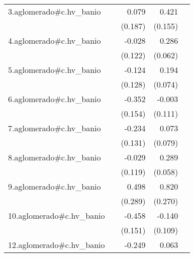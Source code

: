 {\begin{longtable}{l*{4}{D{.}{.}{-1}}}
\addlinespace
3.aglomerado#c.hv\_banio&                     &       0.079         &       0.421\sym{**} &                     \\
            &                     &     (0.187)         &     (0.155)         &                     \\
\addlinespace
4.aglomerado#c.hv\_banio&                     &      -0.028         &       0.286\sym{***}&                     \\
            &                     &     (0.122)         &     (0.062)         &                     \\
\addlinespace
5.aglomerado#c.hv\_banio&                     &      -0.124         &       0.194\sym{**} &                     \\
            &                     &     (0.128)         &     (0.074)         &                     \\
\addlinespace
6.aglomerado#c.hv\_banio&                     &      -0.352\sym{*}  &      -0.003         &                     \\
            &                     &     (0.154)         &     (0.111)         &                     \\
\addlinespace
7.aglomerado#c.hv\_banio&                     &      -0.234         &       0.073         &                     \\
            &                     &     (0.131)         &     (0.079)         &                     \\
\addlinespace
8.aglomerado#c.hv\_banio&                     &      -0.029         &       0.289\sym{***}&                     \\
            &                     &     (0.119)         &     (0.058)         &                     \\
\addlinespace
9.aglomerado#c.hv\_banio&                     &       0.498         &       0.820\sym{**} &                     \\
            &                     &     (0.289)         &     (0.270)         &                     \\
\addlinespace
10.aglomerado#c.hv\_banio&                     &      -0.458\sym{**} &      -0.140         &                     \\
            &                     &     (0.151)         &     (0.109)         &                     \\
\addlinespace
12.aglomerado#c.hv\_banio&                     &      -0.249         &       0.063         &                     \\

\end{longtable}}
